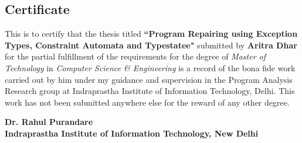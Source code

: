 
\begin{center}
\section*{Certificate}
\label{section:certificate}
\end{center}

This is to certify that the thesis titled \textbf{``Program Repairing using
Exception Types, Constraint Automata and Typestatee"} submitted by
\textbf{Aritra Dhar} for the partial fulfillment of the requirements for the
degree of \emph{Master of Technology} in \emph{Computer Science \& Engineering}
is a record of the bona fide work carried out by him under my guidance and
supervision in the Program Analysis Research group at Indraprastha Institute of
Information Technology, Delhi. This work has not been submitted anywhere else
for the reward of any other degree. \\ \vspace{0.5in}

\textbf{Dr. Rahul Purandare}\\
\textbf{Indraprastha Institute of Information Technology, New Delhi}
